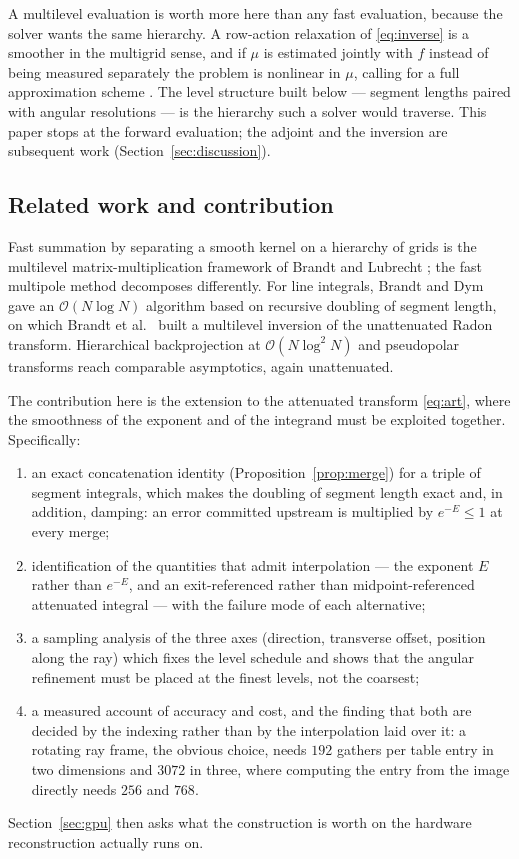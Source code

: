 \documentclass[11pt]{article}
\newcommand{\bigO}{\mathcal{O}}
\begin{document}
A multilevel evaluation is worth more here than any fast evaluation, because
the solver wants the same hierarchy. A row-action relaxation of
\eqref{eq:inverse} is a smoother in the multigrid sense, and if $\mu$ is
estimated jointly with $f$ instead of being measured separately the problem is
nonlinear in $\mu$, calling for a full approximation scheme
\citep{brandt1977}. The level structure built below --- segment lengths paired
with angular resolutions --- is the hierarchy such a solver would traverse.
This paper stops at the forward evaluation; the adjoint and the inversion are
subsequent work (Section~\ref{sec:discussion}).

\subsection{Related work and contribution}

Fast summation by separating a smooth kernel on a hierarchy of grids is the
multilevel matrix-multiplication framework of Brandt and Lubrecht
\citep{brandtlubrecht1990,brandt1991}; the fast multipole method
\citep{greengardrokhlin1987} decomposes differently. For line integrals,
Brandt and Dym \citep{brandtdym1999} gave an $\bigO(N\log N)$ algorithm based
on recursive doubling of segment length, on which Brandt et al.\
\citep{brandtmann2000} built a multilevel inversion of the unattenuated Radon
transform. Hierarchical backprojection at $\bigO(N\log^2 N)$
\citep{basubresler2000} and pseudopolar transforms \citep{averbuch2008} reach
comparable asymptotics, again unattenuated.

The contribution here is the extension to the attenuated transform
\eqref{eq:art}, where the smoothness of the exponent and of the integrand must
be exploited together. Specifically:
\begin{enumerate}
\item an exact concatenation identity (Proposition~\ref{prop:merge}) for a
  triple of segment integrals, which makes the doubling of segment length
  exact and, in addition, damping: an error committed upstream is multiplied by
  $e^{-E}\le 1$ at every merge;
\item identification of the quantities that admit interpolation --- the
  exponent $E$ rather than $e^{-E}$, and an exit-referenced rather than
  midpoint-referenced attenuated integral --- with the failure mode of each
  alternative;
\item a sampling analysis of the three axes (direction, transverse offset,
  position along the ray) which fixes the level schedule and shows that the
  angular refinement must be placed at the finest levels, not the coarsest;
\item a measured account of accuracy and cost, and the finding that both are
  decided by the indexing rather than by the interpolation laid over it: a
  rotating ray frame, the obvious choice, needs $192$ gathers per table entry
  in two dimensions and $3072$ in three, where computing the entry from the
  image directly needs $256$ and $768$.
\end{enumerate}
Section~\ref{sec:gpu} then asks what the construction is worth on the hardware
reconstruction actually runs on.
\end{document}

